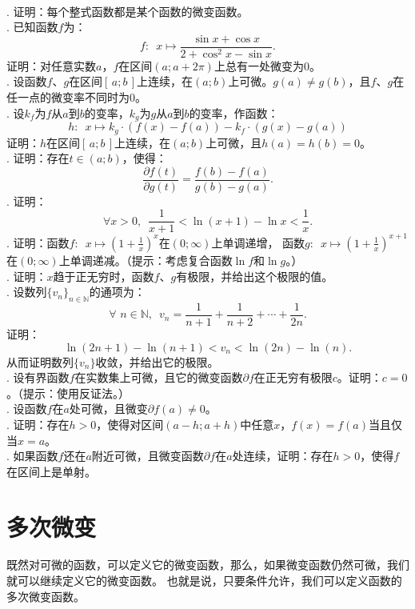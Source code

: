 \documentclass[12pt,UTF8]{ctexbook}
\begin{document}
\begin{xt}
    \mbox{} \\
    . 证明：每个整式函数都是某个函数的微变函数。\\
    . 已知函数$f$为：
    $$ f: \,\,\, x\mapsto \frac{\sin{x} + \cos{x}}{2 + \cos^2{x} - \sin{x}}.$$
    \indent 证明：对任意实数$a$，$f$在区间$(a; a + 2\pi)$上总有一处微变为$0$。\\
    . 设函数$f$、$g$在区间$[\,a; b\,]$上连续，在$(a; b)$上可微。$g(a) \neq g(b)$，且$f$、$g$在任一点的微变率不同时为$0$。\\
    . 设$k_f$为$f$从$a$到$b$的变率，$k_g$为$g$从$a$到$b$的变率，作函数：
    $$ h : \,\,\, x \mapsto k_g \cdot (f(x) - f(a)) - k_f \cdot (g(x) - g(a))$$
    \indent 证明：$h$在区间$[\,a; b\,]$上连续，在$(a; b)$上可微，且$h(a) = h(b) = 0$。\\
    . 证明：存在$t\in(a; b)$，使得：
    $$ \frac{\partial f (t)}{\partial g (t)} = \frac{f(b) - f(a)}{g(b) - g(a)}.$$
    . 证明：
    $$ \forall x > 0, \,\,\, \frac{1}{x+1} < \ln{(x+1)} - \ln{x} < \frac{1}{x}.$$
    . 证明：函数$f: \,\,\,x \mapsto \left(1 + \frac{1}{x}\right)^x$在$(0;\infty)$上单调递增，
    函数$g: \,\,\,x \mapsto \left(1 + \frac{1}{x}\right)^{x+1}$在$(0;\infty)$上单调递减。（提示：考虑复合函数$\ln{f}$和$\ln{g}$。）\\
    . 证明：$x$趋于正无穷时，函数$f$、$g$有极限，并给出这个极限的值。\\
    . 设数列$\{v_n\}_{n\in\mathbb{N}}$的通项为：
    $$ \forall \,\, n\in\mathbb{N},\,\,\, v_n = \frac{1}{n+1} + \frac{1}{n+2} + \cdots + \frac{1}{2n}. $$
    证明：
    $$ \ln{(2n + 1)} - \ln{(n + 1)}  < v_n < \ln{(2n)} - \ln{(n)}. $$
    从而证明数列$\{v_n\}$收敛，并给出它的极限。\\
    . 设有界函数$f$在实数集上可微，且它的微变函数$\partial f$在正无穷有极限$c$。证明：$c = 0$。（提示：使用反证法。）\\
    . 设函数$f$在$a$处可微，且微变$\partial f(a) \neq 0$。\\
    . 证明：存在$h>0$，使得对区间$(a-h;a+h)$中任意$x$，$f(x) = f(a)$当且仅当$x = a$。\\
    . 如果函数$f$还在$a$附近可微，且微变函数$\partial f$在$a$处连续，证明：存在$h>0$，使得$f$在区间上是单射。

\end{xt}

\section{多次微变}
既然对可微的函数，可以定义它的微变函数，那么，如果微变函数仍然可微，我们就可以继续定义它的微变函数。
也就是说，只要条件允许，我们可以定义函数的多次微变函数。
\end{document}
